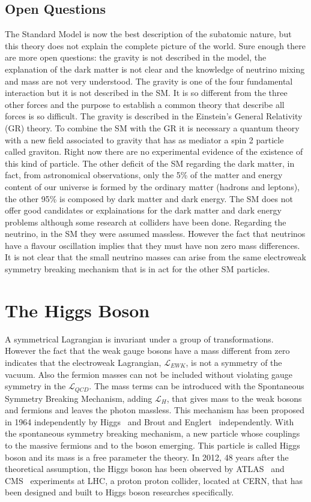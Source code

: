 \subsection*{Open Questions} The Standard Model is now the best description of the subatomic nature, but this theory does not explain the complete picture of the world. Sure enough there are more open questions: the gravity is not described in the model, the explanation of the dark matter is not clear and the knowledge of neutrino mixing and mass are not very understood.
The gravity is one of the four fundamental interaction but it is not described in the  SM. It is so different from the three other
forces and the purpose to establish a common theory that describe all forces is so difficult. The gravity is described in the  Einstein’s General Relativity (GR) theory. To combine the  SM with the GR it is necessary a quantum theory with a new field associated to gravity that has as mediator a spin 2 particle called graviton. Right now there are no experimental evidence of the existence of this kind of particle. The other deficit of the SM regarding the dark matter, in fact, from astronomical observations, only the 5\% of the  matter and energy content of our universe is formed by the ordinary matter (hadrons and leptons), the other 95\% is composed by dark matter and dark energy. The SM does not offer good candidates or explainations for the dark matter and dark energy problems although some research at colliders have been done.
Regarding the neutrino, in the SM they were assumed massless. However the fact that
neutrinos have a  flavour oscillation implies that they must have non zero mass differences.
It is not clear that the small neutrino masses  can arise from the same electroweak symmetry breaking mechanism that
is in act for the other SM particles.



\section{The Higgs Boson}
\label{H}
A symmetrical Lagrangian is invariant under a group of transformations. However the fact that the weak gauge bosons have a mass different from zero indicates that
the electroweak Lagrangian, $\mathcal{L}_{EWK}$, is not a symmetry of the vacuum. Also the fermion masses can
not be included without violating gauge symmetry in the $\mathcal{L}_{QCD}$.
The mass terms can be introduced with the Spontaneous Symmetry Breaking Mechanism, adding  $\mathcal{L}_{H}$, that gives mass to the weak bosons and fermions and leaves the photon massless. This mechanism has been proposed in 1964 independently by Higgs~\cite{HIGGS1964132} and Brout and Englert~\cite{PhysRevLett.13.321} independently. With the spontaneous symmetry breaking mechanism, a  new particle whose couplings to the massive fermions and to the boson emerging. This particle is called Higgs boson and its mass is a free parameter the theory. In 2012, 48 years after the theoretical assumption, the Higgs boson has been observed by ATLAS~\cite{Aad:2012tfa} and CMS~\cite{Chatrchyan:2012xdj} experiments at LHC, a  proton proton collider, located at CERN, that has been designed and built to Higgs boson researches specifically. 

